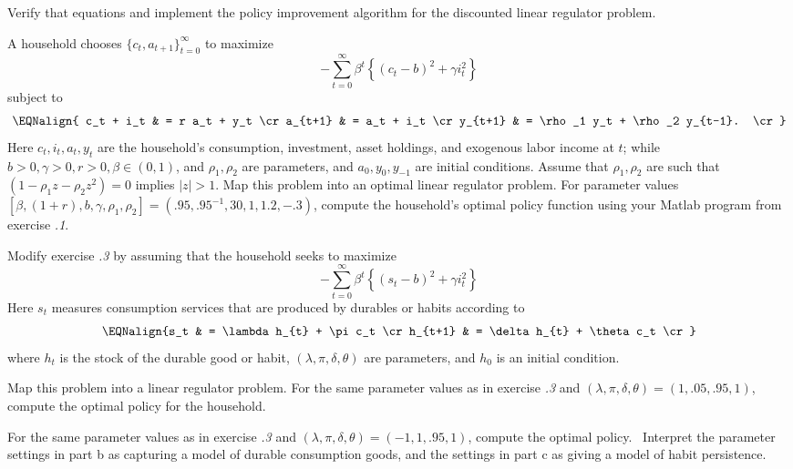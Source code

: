 \medskip
{} \quad  Verify that equations
  and 
implement the policy improvement algorithm for the discounted
linear regulator problem.

\medskip
{} \quad  A household chooses $\{c_t, a_{t+1}\}_{t=0}^\infty$ to maximize
$$ - \sum_{t=0}^\infty \beta^t \left\{(c_t - b)^2 + \gamma i_t^2
  \right\} $$
subject to
$$\EQNalign{ c_t + i_t & = r a_t + y_t \cr %
             a_{t+1} & = a_t + i_t \cr %
            y_{t+1} & = \rho_1 y_t + \rho_2 y_{t-1}. \cr} $$ %
Here $c_t, i_t, a_t, y_t$ are the household's consumption,
investment, asset holdings, and exogenous labor income at $t$;
while $b > 0, \gamma > 0, r>0, \beta \in (0,1)$, and
$\rho_1, \rho_2$ are parameters, and $a_0, y_{0}, y_{-1}$ are initial conditions.
Assume that $\rho_1, \rho_2$ are such that $(1 -\rho_1 z - \rho_2 z^2) = 0$
implies $\vert z \vert > 1$.
\medskip
{}  Map this problem into an optimal linear regulator
problem.
\medskip
{}
For parameter values $[\beta, (1+r), b, \gamma, \rho_1,
\rho_2] = (.95, .95^{-1}, 30, 1, 1.2, -.3)$, compute the household's
optimal policy function using your Matlab program from exercise {\it \the\chapternum.1\/}.

\medskip
{} \quad   Modify exercise {\it \the\chapternum.3\/} by assuming that the household
seeks to maximize
$$ - \sum_{t=0}^\infty \beta^t \left\{(s_t - b)^2 + \gamma i_t^2 \right\}$$
Here $s_t$  measures consumption services that are produced
by durables or habits according to
$$\EQNalign{s_t & = \lambda  h_{t} + \pi c_t  \cr %
            h_{t+1} & = \delta h_{t} + \theta c_t \cr} %
$$
where $h_t$ is the stock of the durable good or habit,
$(\lambda, \pi, \delta, \theta)$ are  parameters, and
$h_{0}$ is an initial condition.

\medskip
{}  Map this problem into a linear regulator problem.
\medskip
{}  For   the same parameter values   as in
exercise {\it \the\chapternum.3\/} and
$(\lambda, \pi, \delta, \theta) = (1, .05, .95, 1)$, compute
the optimal policy for the household.

\medskip
{}  For the same parameter values as in exercise {\it \the\chapternum.3\/}
and
$(\lambda, \pi, \delta, \theta) = (-1, 1, .95, 1)$, compute
the optimal policy.
\medskip
{}\
 Interpret the parameter settings
in part b as capturing a  model   of durable consumption goods, and
the settings in part c as giving a model of habit persistence.

